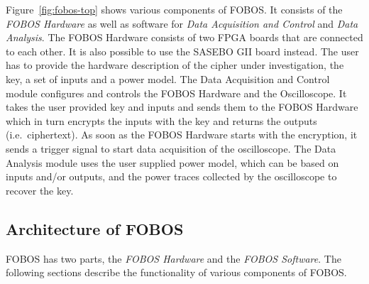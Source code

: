 \documentclass{llncs}
\numberwithin{algorithm}{chapter}
\begin{document}
Figure~\ref{fig:fobos-top} shows various components of FOBOS. It consists of the 
\emph{FOBOS Hardware} as well as software for \emph{Data Acquisition and Control} 
and \emph{Data Analysis}. The FOBOS Hardware consists of two FPGA boards that 
are connected to each other. It is also possible to use the SASEBO GII board instead.
The user has to provide the hardware description of the
cipher under investigation, the key, a set of inputs and a power model. 
The Data Acquisition and Control module configures and controls the 
FOBOS Hardware and the Oscilloscope.  It takes the user provided key and
inputs and sends them to the FOBOS Hardware which in turn encrypts the inputs 
with the key and returns the outputs (i.e.\ ciphertext). As soon as the FOBOS 
Hardware starts with the encryption, it sends a trigger signal to start data
acquisition of the oscilloscope.  The Data Analysis module uses the user 
supplied power model, which can be based on inputs and/or outputs, and the 
power traces collected by the oscilloscope to recover the key. 






\subsection{Architecture of FOBOS}
FOBOS has two parts, the \emph{FOBOS Hardware} and the \emph{FOBOS Software}. 
The following sections describe the functionality of various components of FOBOS.
\end{document}
